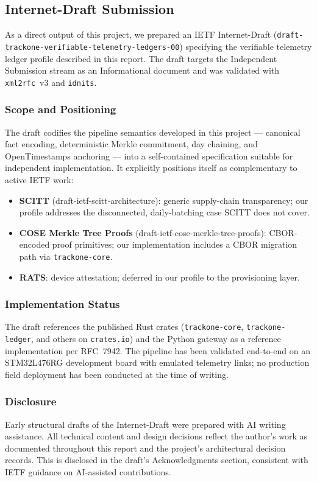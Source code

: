 \subsection{Internet-Draft Submission}
\label{subsec:internet-draft}

As a direct output of this project, we prepared an \ac{IETF} Internet-Draft
(\texttt{draft-trackone-verifiable-telemetry-ledgers-00}) specifying the
verifiable telemetry ledger profile described in this report.
The draft
targets the Independent Submission stream as an Informational document
and was validated with \texttt{xml2rfc}~v3 and \texttt{idnits}.

\subsubsection{Scope and Positioning}

The draft codifies the pipeline semantics developed in this project ---
canonical fact encoding, deterministic Merkle commitment, day chaining,
and OpenTimestamps anchoring --- into a self-contained specification
suitable for independent implementation.
It explicitly positions itself
as complementary to active \ac{IETF} work:

\begin{itemize}
    \item \textbf{SCITT} (draft-ietf-scitt-architecture): generic
    supply-chain transparency; our profile addresses the
    disconnected, daily-batching case S\ac{CI}TT does not cover.
    \item \textbf{COSE Merkle Tree Proofs} (draft-ietf-cose-merkle-tree-proofs):
    \ac{CBOR}-encoded proof primitives; our implementation includes a
    \ac{CBOR} migration path via \texttt{trackone-core}.
    \item \textbf{RATS}: device attestation; deferred in our profile to
    the provisioning layer.
\end{itemize}

\subsubsection{Implementation Status}

The draft references the published Rust crates (\texttt{trackone-core},
\texttt{trackone-ledger}, and others on \texttt{crates.io}) and the
Python gateway as a reference implementation per \ac{RFC}~7942.
The pipeline
has been validated end-to-end on an STM32L476RG development board with
emulated telemetry links; no production field deployment has been
conducted at the time of writing.

\subsubsection{Disclosure}

Early structural drafts of the Internet-Draft were prepared with AI
writing assistance.
All technical content and design decisions reflect
the author's work as documented throughout this report and the project's
architectural decision records.
This is disclosed in the draft's
Acknowledgments section, consistent with \ac{IETF} guidance on AI-assisted
contributions.
